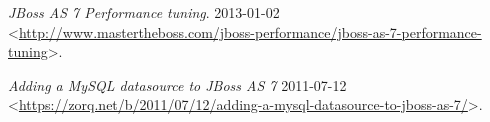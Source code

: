 \documentclass[122pt,oneside]{fithesis}
\begin{document}
\begin{thebibliography}{99}
\emph{JBoss AS 7 Performance tuning}.
2013-01-02
\textless\href{http://www.mastertheboss.com/jboss-performance/jboss-as-7-performance-tuning}{http://www.mastertheboss.com/jboss-performance/jboss-as-7-performance-tuning}\textgreater.

\emph{Adding a MySQL datasource to JBoss AS 7}
2011-07-12
\textless\href{https://zorq.net/b/2011/07/12/adding-a-mysql-datasource-to-jboss-as-7/}{https://zorq.net/b/2011/07/12/adding-a-mysql-datasource-to-jboss-as-7/}\textgreater.

\end{thebibliography} %



\end{document}
